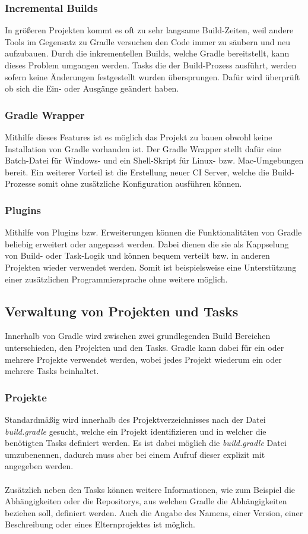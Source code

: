 \subsubsection{Incremental Builds}
In größeren Projekten kommt es oft zu sehr langsame Build-Zeiten, weil andere Tools im Gegensatz zu Gradle versuchen den Code immer zu säubern und neu aufzubauen. Durch die inkrementellen Builds, welche Gradle bereitstellt, kann dieses Problem umgangen werden. Tasks die der Build-Prozess ausführt, werden sofern keine Änderungen festgestellt wurden übersprungen. Dafür wird überprüft ob sich die Ein- oder Ausgänge geändert haben.

\subsubsection{Gradle Wrapper}
Mithilfe dieses Features ist es möglich das Projekt zu bauen obwohl keine Installation von Gradle vorhanden ist. Der Gradle Wrapper stellt dafür eine Batch-Datei für Windows- und ein Shell-Skript für Linux- bzw. Mac-Umgebungen bereit. Ein weiterer Vorteil ist die Erstellung neuer \gls{CI} Server, welche die Build-Prozesse somit ohne zusätzliche Konfiguration ausführen können.

\subsubsection{Plugins}
Mithilfe von Plugins bzw. Erweiterungen können die Funktionalitäten von Gradle beliebig erweitert oder angepasst werden. Dabei dienen die sie als Kappselung von Build- oder Task-Logik und können bequem verteilt bzw. in anderen Projekten wieder verwendet werden. Somit ist beispielsweise eine Unterstützung einer zusätzlichen Programmiersprache ohne weitere möglich.

\subsection{Verwaltung von Projekten und Tasks}
Innerhalb von Gradle  wird zwischen zwei grundlegenden Build Bereichen unterschieden, den Projekten und den Tasks. Gradle kann dabei für ein oder mehrere Projekte verwendet werden, wobei jedes Projekt wiederum ein oder mehrere Tasks beinhaltet.

\subsubsection{Projekte}
Standardmäßig wird innerhalb des Projektverzeichnisses nach der Datei \textit{build.gradle} gesucht, welche ein Projekt identifizieren und in welcher die benötigten Tasks definiert werden. Es ist dabei möglich die \textit{build.gradle} Datei umzubenennen, dadurch muss aber bei einem Aufruf dieser explizit mit angegeben werden.\\
\\
Zusätzlich neben den Tasks können weitere Informationen, wie zum Beispiel die Abhängigkeiten oder die Repositorys, aus welchen Gradle die Abhängigkeiten beziehen soll, definiert werden. Auch die Angabe des Namens, einer Version, einer Beschreibung oder eines Elternprojektes ist möglich.


